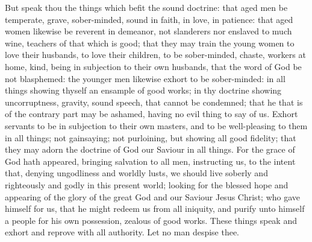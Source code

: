 But speak thou the things which befit the sound doctrine: that aged men be temperate, grave, sober-minded, sound in faith, in love, in patience: that aged women likewise be reverent in demeanor, not slanderers nor enslaved to much wine, teachers of that which is good; that they may train the young women to love their husbands, to love their children, to be sober-minded, chaste, workers at home, kind, being in subjection to their own husbands, that the word of God be not blasphemed: the younger men likewise exhort to be sober-minded: in all things showing thyself an ensample of good works; in thy doctrine showing uncorruptness, gravity, sound speech, that cannot be condemned; that he that is of the contrary part may be ashamed, having no evil thing to say of us. Exhort servants to be in subjection to their own masters, and to be well-pleasing to them in all things; not gainsaying; not purloining, but showing all good fidelity; that they may adorn the doctrine of God our Saviour in all things. For the grace of God hath appeared, bringing salvation to all men, instructing us, to the intent that, denying ungodliness and worldly lusts, we should live soberly and righteously and godly in this present world; looking for the blessed hope and appearing of the glory of the great God and our Saviour Jesus Christ; who gave himself for us, that he might redeem us from all iniquity, and purify unto himself a people for his own possession, zealous of good works.  These things speak and exhort and reprove with all authority. Let no man despise thee. 

